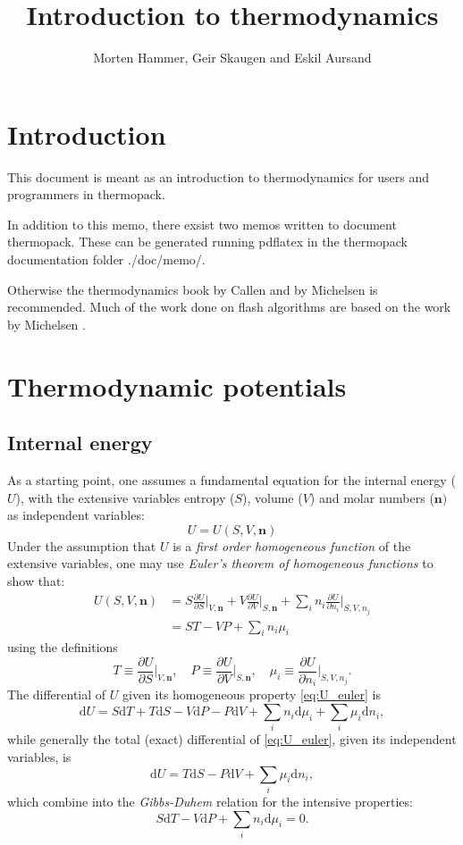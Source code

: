 \documentclass[english]{../thermomemo/thermomemo}
\title{Introduction to thermodynamics}
\author{Morten Hammer, Geir Skaugen and Eskil Aursand}
\newcommand{\pone}[3]{\frac{\partial #1}{\partial #2}\bigg|_{#3}}%
\newcommand*{\vektor}[1]{\boldsymbol{#1}}%
\newcommand{\dd}[1]{\mathrm{d}{#1}}
\begin{document}
\frontmatter

\tableofcontents

\section{Introduction}
This document is meant as an introduction to thermodynamics for users
and programmers in thermopack.

In addition to this memo, there exsist two memos written to document
thermopack. These can be generated running pdflatex in the thermopack
documentation folder ./doc/memo/.

Otherwise the thermodynamics book by Callen \cite{callen85} and by
Michelsen \cite{michelsen07} is recommended. Much of the work done on
flash algorithms are based on the work by Michelsen
\cite{michelsen82a,michelsen82b,michelsen99}.

\section{Thermodynamic potentials}
\subsection{Internal energy}
As a starting point, one assumes a fundamental equation for the internal energy ($U$), with the extensive variables entropy ($S$), volume ($V$) 
and molar numbers ($\vektor{n})$ as independent variables:
\begin{equation}
  U = U(S,V,\vektor{n})
  \label{}
\end{equation}
Under the assumption that $U$ is a \textit{first order homogeneous function} of the extensive variables, one may use 
\textit{Euler's theorem of homogeneous functions} to show that:
\begin{align}
  U(S,V,\vektor{n}) &= S \pone{U}{S}{V,\vektor{n}}
  +V \pone{U}{V}{S,\vektor{n}}
  +\sum_i n_i \pone{U}{n_i}{S,V,n_j} \nonumber \\
  &= ST - VP + \sum_i n_i \mu_i
  \label{eq:U_euler}
\end{align}
using the definitions 
\begin{equation}
  T \equiv \pone{U}{S}{V,\vektor{n}}, \quad P \equiv \pone{U}{V}{S,\vektor{n}}, \quad \mu_i \equiv \pone{U}{n_i}{S,V,n_j}.
  \label{}
\end{equation}
The differential of $U$ given its homogeneous property \eqref{eq:U_euler} is 
\begin{equation}
  \dd{U} = S\dd{T} + T\dd{S} - V\dd{P} - P\dd{V} + \sum_i n_i \dd{\mu_i} + \sum_i \mu_i \dd{n_i},
  \label{}
\end{equation}
while generally the total (exact) differential of \eqref{eq:U_euler}, given its independent variables, is
\begin{equation}
  \dd{U} = T\dd{S} - P\dd{V} + \sum_i \mu_i \dd{n_i},
  \label{eq:U_totaldiff}
\end{equation}
which combine into the \textit{Gibbs-Duhem} relation for the intensive properties:
\begin{equation}
  S\dd{T} - V\dd{P} + \sum_i n_i \dd{\mu_i} = 0.
  \label{eq:gibbsduhem}
\end{equation}
\end{document}

